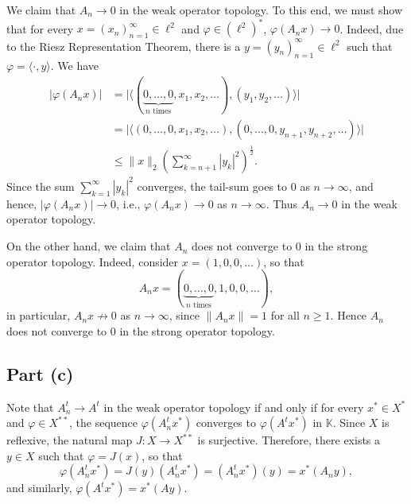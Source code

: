 \documentclass[11pt]{article}
\theoremstyle{thmstyle}
\theoremstyle{defstyle}
\newcommand{\R}{\mathbb{R}}
\newcommand{\bbC}{\mathbb{C}}
\newcommand{\K}{\mathbb{K}} %
\renewcommand{\le}{\leqslant}
\renewcommand{\ge}{\geqslant}
\begin{document}
We claim that $A_n\to 0$ in the weak operator topology. To this end, we must show that for every $x = (x_n)_{n = 1}^\infty\in\ell^2$ and $\varphi\in\left(\ell^2\right)^\ast$, $\varphi(A_n x)\to 0$. Indeed, due to the Riesz Representation Theorem, there is a $y = (y_n)_{n = 1}^\infty\in\ell^2$ such that $\varphi = \langle\cdot, y\rangle$. We have 
\begin{align*}
    |\varphi(A_n x)| &= \big|\big\langle (\underbrace{0, \dots, 0}_{n\text{ times}}, x_1, x_2, \dots), (y_1, y_2, \dots)\big\rangle\big|\\
    &= \big|\big\langle(0,\dots, 0, x_1, x_2, \dots), (0, \dots, 0, y_{n + 1}, y_{n + 2}, \dots)\big\rangle\big|\\
    &\le\|x\|_2\left(\sum_{k = n + 1}^\infty |y_k|^2\right)^{\frac{1}{2}}.
\end{align*}
Since the sum $\displaystyle\sum_{k = 1}^\infty |y_k|^2$ converges, the tail-sum goes to $0$ as $n\to\infty$, and hence, $|\varphi(A_n x)|\to 0$, i.e., $\varphi(A_n x)\to 0$ as $n\to\infty$. Thus $A_n\to 0$ in the weak operator topology.

On the other hand, we claim that $A_n$ does not converge to $0$ in the strong operator topology. Indeed, consider $x = (1, 0, 0, \dots)$, so that 
\begin{equation*}
    A_n x = (\underbrace{0, \dots, 0}_{n\text{ times}}, 1, 0, 0, \dots),
\end{equation*}
in particular, $A_n x\not\to0$ as $n\to\infty$, since $\|A_n x\| = 1$ for all $n\ge 1$. Hence $A_n$ does not converge to $0$ in the strong operator topology.

\subsection{Part (c)}

Note that $A_n^t\to A^t$ in the weak operator topology if and only if for every $x^\ast\in X^\ast$ and $\varphi\in X^{\ast\ast}$, the sequence $\varphi(A_n^t x^\ast)$ converges to $\varphi(A^t x^\ast)$ in $\K$. Since $X$ is reflexive, the natural map $J\colon X\to X^{\ast\ast}$ is surjective. Therefore, there exists a $y\in X$ such that $\varphi = J(x)$, so that 
\begin{equation*}
    \varphi\left(A_n^t x^\ast\right) = J(y)\left(A_n^t x^\ast\right) = \left(A_n^t x^\ast\right)(y) = x^\ast\left(A_n y\right),
\end{equation*}
and similarly, $\varphi\left(A^t x^\ast\right) = x^\ast(A y)$.
\end{document}
